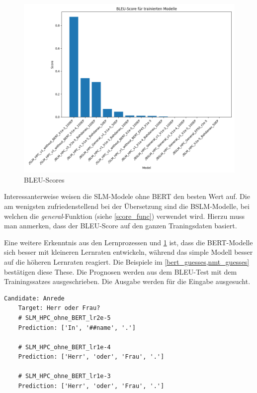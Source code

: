 \begin{figure}[H]
	\centering
	\includegraphics[scale=0.55]{images/bleu_scores_4.png}
	\caption{BLEU-Scores}
	\label{bleu_score}
\end{figure}

Interessanterweise weisen die SLM-Modele ohne BERT den besten Wert auf. Die am wenigsten zufriedenstellend bei der Übersetzung sind die BSLM-Modelle, bei welchen die \textit{general}-Funktion (siehe \cref{score_func}) verwendet wird. Hierzu muss man anmerken, dass der BLEU-Score auf den ganzen Traningsdaten basiert.

Eine weitere Erkenntnis aus den Lernprozessen und \cref{bleu_score} ist, dass die BERT-Modelle sich besser mit kleineren Lernraten entwickeln, während das simple Modell besser auf die höheren Lernraten reagiert. Die Beispiele im \cref{bert_guesses,nmt_guesses} bestätigen diese These. Die Prognosen werden aus dem BLEU-Test mit dem Trainingssatzes ausgeschrieben. Die Ausgabe werden für die Eingabe  ausgesucht.

\begin{lstlisting}[label=nmt_guesses, caption={Prognosen von Simple-Language-Model}]
	Candidate: Anrede
	Target: Herr oder Frau?
	# SLM_HPC_ohne_BERT_lr2e-5
	Prediction: ['In', '##name', '.']
	
	# SLM_HPC_ohne_BERT_lr1e-4
	Prediction: ['Herr', 'oder', 'Frau', '.']
	
	# SLM_HPC_ohne_BERT_lr1e-3
	Prediction: ['Herr', 'oder', 'Frau', '.']
\end{lstlisting}

